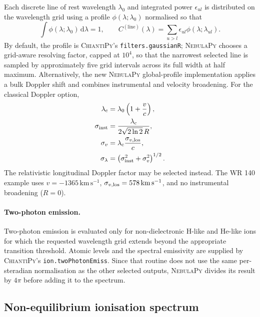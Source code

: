 Each discrete line of rest wavelength $\lambda_0$ and integrated power
$\epsilon_{ul}$ is distributed on the wavelength grid using a profile
$\phi(\lambda;\lambda_0)$ normalised so that
\begin{equation}
  \int\phi(\lambda;\lambda_0)\,\mathrm d\lambda=1,
  \qquad
  C^{(\mathrm{line})}(\lambda)
  =\sum_{u>l}\epsilon_{ul}\phi(\lambda;\lambda_{ul}).
\end{equation}
By default, the profile is \textsc{ChiantiPy}'s
\texttt{filters.gaussianR}; \textsc{NebulaPy} chooses a grid-aware resolving
factor, capped at $10^4$, so that the narrowest selected line is sampled by
approximately five grid intervals across its full width at half maximum.
Alternatively, the new \textsc{NebulaPy} global-profile implementation applies
a bulk Doppler shift and combines instrumental and velocity broadening.  For
the classical Doppler option,
\begin{align}
  \lambda_{\rm c} &= \lambda_0\left(1+\frac{v}{c}\right),\\
  \sigma_{\rm inst} &=
    \frac{\lambda_{\rm c}}{2\sqrt{2\ln2}\,R},\\
  \sigma_v &= \lambda_{\rm c}\frac{\sigma_{v,\rm los}}{c},\\
  \sigma_\lambda &=
    \left(\sigma_{\rm inst}^2+\sigma_v^2\right)^{1/2}.
\end{align}
The relativistic longitudinal Doppler factor may be selected instead.  The WR
140 example uses $v=-1365\,\mathrm{km\,s^{-1}}$,
$\sigma_{v,\rm los}=578\,\mathrm{km\,s^{-1}}$, and no instrumental broadening
($R=0$).

\paragraph{Two-photon emission.}
Two-photon emission is evaluated only for non-dielectronic H-like and He-like
ions for which the requested wavelength grid extends beyond the appropriate
transition threshold.  Atomic levels and the spectral emissivity are supplied
by \textsc{ChiantiPy}'s \texttt{ion.twoPhotonEmiss}.  Since that routine does
not use the same per-steradian normalisation as the other selected outputs,
\textsc{NebulaPy} divides its result by $4\pi$ before adding it to the spectrum.

\subsection{Non-equilibrium ionisation spectrum}

